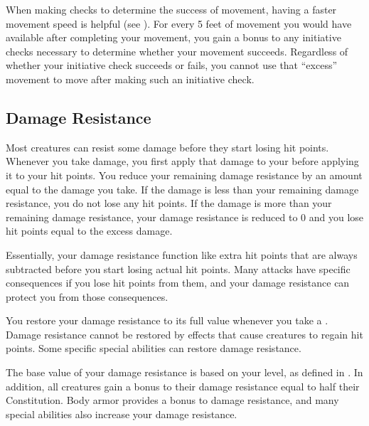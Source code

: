         \label{Movement-Based Initiative}
        When making  checks to determine the success of movement, having a faster movement speed is helpful (see ).
        For every 5 feet of movement you would have available after completing your movement, you gain a  bonus to any initiative checks necessary to determine whether your movement succeeds.
        Regardless of whether your initiative check succeeds or fails, you cannot use that ``excess'' movement to move after making such an initiative check.

    \subsection{Damage Resistance}\label{Damage Resistance}
        Most creatures can resist some damage before they start losing hit points.
        Whenever you take damage, you first apply that damage to your  before applying it to your hit points.
        You reduce your remaining damage resistance by an amount equal to the damage you take.
        If the damage is less than your remaining damage resistance, you do not lose any hit points.
        If the damage is more than your remaining damage resistance, your damage resistance is reduced to 0 and you lose hit points equal to the excess damage.

        Essentially, your damage resistance function like extra hit points that are always subtracted before you start losing actual hit points.
        Many attacks have specific consequences if you lose hit points from them, and your damage resistance can protect you from those consequences.

        You restore your damage resistance to its full value whenever you take a .
        Damage resistance cannot be restored by effects that cause creatures to regain hit points.
        Some specific special abilities can restore damage resistance.

        The base value of your damage resistance is based on your level, as defined in .
        In addition, all creatures gain a bonus to their damage resistance equal to half their Constitution.
        Body armor provides a bonus to damage resistance, and many special abilities also increase your damage resistance.

